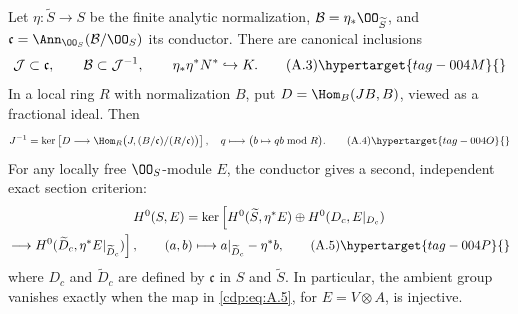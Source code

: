 \begin{proposition}\hypertarget{tag-01AG}{}\label{cdp:st:A.2.2}
\label{wbII:lem:conductor}\label{wbII:lem:conductor-square}
Let $\eta:\widetilde S\to S$ be the finite analytic normalization, $\mathcal B=\eta_*\OO_{\widetilde S}$, and $\mathfrak c=\Ann_{\OO_S}(\mathcal B/\OO_S)$ its conductor. There are canonical inclusions
\[
 \mathcal J\subset\mathfrak c,\qquad
 \mathcal B\subset\mathcal J^{-1},\qquad
 \eta_*\eta^*N^*\hookrightarrow K.
\tag{A.3}\hypertarget{tag-004M}{}\label{cdp:eq:A.3}
\]
In a local ring $R$ with normalization $B$, put $D=\Hom_B(JB,B)$, viewed as a fractional ideal. Then
\[
 J^{-1}=\ker\left[D\longrightarrow
 \Hom_R\bigl(J,(B/\mathfrak c)/(R/\mathfrak c)\bigr)\right],
\quad q\longmapsto\bigl(b\mapsto qb\bmod R\bigr).
\tag{A.4}\hypertarget{tag-004O}{}\label{cdp:eq:A.4}
\]
For any locally free $\OO_S$-module $E$, the conductor gives a second, independent exact section criterion:
\begin{multline}
H^0(S,E)=
\ker\left[H^0(\widetilde S,\eta^*E)\oplus H^0(D_c,E|_{D_c})\right.\\
\left.\longrightarrow H^0(\widetilde D_c,\eta^*E|_{\widetilde D_c})\right],
\qquad (a,b)\longmapsto a|_{\widetilde D_c}-\eta^*b,
\tag{A.5}\hypertarget{tag-004P}{}\label{cdp:eq:A.5}
\end{multline}
where $D_c$ and $\widetilde D_c$ are defined by $\mathfrak c$ in $S$ and $\widetilde S$. In particular, the ambient group vanishes exactly when the map in \eqref{cdp:eq:A.5}, for $E=V\otimes A$, is injective.
\end{proposition}


